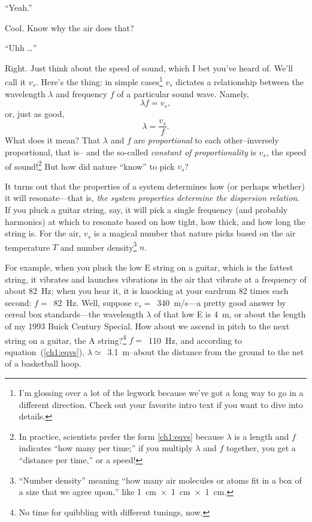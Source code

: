 \X ``Yeah.''


Cool. Know why the air does that?


\X ``Uhh \dots''


\setlength\parindent{\savedparindent}
\setlength\parskip{\savedparskip}

Right. Just think about the speed of sound, which I bet you've heard
of. We'll call it $v_s$. Here's the thing: in simple
cases\footnote{I'm glossing over a lot of the legwork because we've
  got a long way to go in a different direction. Check out your
  favorite intro text if you want to dive into details.}  $v_s$
dictates a relationship between the wavelength $\lambda$ and frequency
$f$ of a particular sound wave. Namely,
\begin{equation}
  \label{ch1:eqvs}
  \lambda f = v_s,
\end{equation}
or, just as good,
\begin{equation}
  \label{ch1:eqvsdiff}
  \lambda = \dfrac{v_s}{f}.
\end{equation}
What does it mean? That $\lambda$ and $f$ are \emph{proportional} to
each other--inversely proportional, that is-- and the so-called
\emph{constant of proportionality} is $v_s$, the speed of
sound!\footnote{In practice, scientists prefer the form \ref{ch1:eqvs}
  because $\lambda$ is a length and $f$ indicates ``how many per
  time;'' if you multiply $\lambda$ and $f$ together, you get a
  ``distance per time,'' or a speed!} But how did nature ``know'' to
pick $v_s$?

It turns out that the properties of a system determines how (or
perhaps whether) it will resonate---that is, \emph{the system
  properties determine the dispersion relation}. If you pluck a guitar
string, say, it will pick a single frequency (and probably harmonics)
at which to resonate based on how tight, how thick, and how long the
string is. For the air, $v_s$ is a magical number that nature picks
based on the air temperature $T$ and number density\footnote{``Number
  density'' meaning ``how many air molecules or atoms fit in a box of
  a size that we agree upon,'' like 1~cm~$\times$~1~cm~$\times$~1~cm.}
$n$.

For example, when you pluck the low E string on a guitar, which is the
fattest string, it vibrates and launches vibrations in the air that
vibrate at a frequency of about 82~Hz; when you hear it, it is
knocking at your eardrum 82 times each second: $f = $~82~Hz. Well,
suppose $v_s =$~340~m/s---a pretty good answer by cereal box
standards---the wavelength $\lambda$ of that low E is 4~m, or about
the length of my 1993 Buick Century Special. How about we ascend in
pitch to the next string on a guitar, the A string?\footnote{No time
  for quibbling with different tunings, now.}  $f = $~110~Hz, and
according to equation~(\ref{ch1:eqvs}), $\lambda \simeq$~3.1~m--about
the distance from the ground to the net of a basketball hoop.

